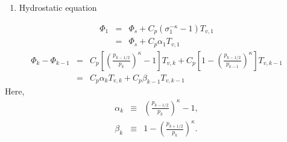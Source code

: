 \begin{enumerate}
\def\labelenumi{\arabic{enumi}.}
\setcounter{enumi}{1}
\tightlist
\item
  Hydrostatic equation
\end{enumerate}
\begin{eqnarray}
 \Phi_{1}  &=&  \Phi_{s} + C_{p} ( \sigma_{1}^{-\kappa} - 1  ) T_{v,1} \\
           &=&  \Phi_{s} + C_{p} \alpha_{1} T_{v,1} 
\end{eqnarray}
\begin{eqnarray}
 \Phi_k - \Phi_{k-1} 
  &=&  C_{p}
   \left[ \left( \frac{ p_{k-1/2} }{ p_k } \right)^{\kappa}
          - 1 \right] T_{v,k} 
       + C_{p}
   \left[ 1- 
         \left( \frac{ p_{k-1/2} }{ p_{k-1} } \right)^{\kappa}
              \right] T_{v,k-1} \\
   &=&    C_{p} \alpha_k T_{v,k} + C_{p} \beta_{k-1} T_{v,k-1}
\end{eqnarray}
Here,
\begin{eqnarray}
 \alpha_k &\equiv & \left( \frac{ p_{k-1/2} }
                               { p_k } \right)^{\kappa} -1, \\
 \beta_k &\equiv &  1- \left( \frac{ p_{k+1/2} }
                               { p_k } \right)^{\kappa} .
\end{eqnarray}

